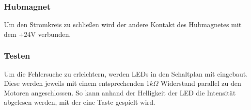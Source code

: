 \subsubsection{Hubmagnet}

Um den Stromkreis zu schließen wird der andere Kontakt des Hubmagnetes mit dem +24V verbunden.

\subsubsection{Testen}

Um die Fehlersuche zu erleichtern, werden LEDs in den Schaltplan mit eingebaut.
Diese werden jeweils mit einem entsprechenden $1k\Omega$ Widerstand parallel zu den Motoren angeschlossen.
So kann anhand der Helligkeit der LED die Intensität abgelesen werden, mit der eine Taste gespielt wird.

